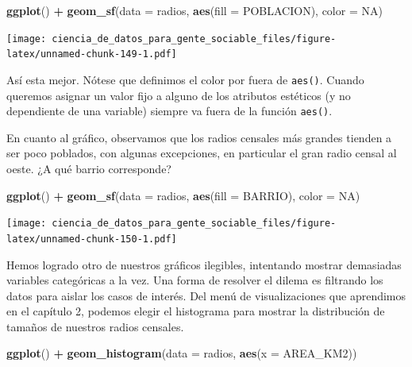 \documentclass[]{book}
\newenvironment{Shaded}{\begin{snugshade}}{\end{snugshade}}
\newcommand{\KeywordTok}[1]{\textcolor[rgb]{0.13,0.29,0.53}{\textbf{#1}}}
\newcommand{\DataTypeTok}[1]{\textcolor[rgb]{0.13,0.29,0.53}{#1}}
\newcommand{\StringTok}[1]{\textcolor[rgb]{0.31,0.60,0.02}{#1}}
\newcommand{\OtherTok}[1]{\textcolor[rgb]{0.56,0.35,0.01}{#1}}
\newcommand{\OperatorTok}[1]{\textcolor[rgb]{0.81,0.36,0.00}{\textbf{#1}}}
\newcommand{\NormalTok}[1]{#1}
\begin{document}
\begin{Shaded}
\begin{Highlighting}[]
\KeywordTok{ggplot}\NormalTok{() }\OperatorTok{+}\StringTok{ }\KeywordTok{geom_sf}\NormalTok{(}\DataTypeTok{data =}\NormalTok{ radios, }\KeywordTok{aes}\NormalTok{(}\DataTypeTok{fill =}\NormalTok{ POBLACION), }\DataTypeTok{color =} \OtherTok{NA}\NormalTok{)}
\end{Highlighting}
\end{Shaded}

\texttt{[image: ciencia\_de\_datos\_para\_gente\_sociable\_files/figure-latex/unnamed-chunk-149-1.pdf]}

Así esta mejor. Nótese que definimos el color por fuera de
\texttt{aes()}. Cuando queremos asignar un valor fijo a alguno de los
atributos estéticos (y no dependiente de una variable) siempre va fuera
de la función \texttt{aes()}.

En cuanto al gráfico, observamos que los radios censales más grandes
tienden a ser poco poblados, con algunas excepciones, en particular el
gran radio censal al oeste. ¿A qué barrio corresponde?

\begin{Shaded}
\begin{Highlighting}[]
\KeywordTok{ggplot}\NormalTok{() }\OperatorTok{+}\StringTok{ }\KeywordTok{geom_sf}\NormalTok{(}\DataTypeTok{data =}\NormalTok{ radios, }\KeywordTok{aes}\NormalTok{(}\DataTypeTok{fill =}\NormalTok{ BARRIO), }\DataTypeTok{color =} \OtherTok{NA}\NormalTok{)}
\end{Highlighting}
\end{Shaded}

\texttt{[image: ciencia\_de\_datos\_para\_gente\_sociable\_files/figure-latex/unnamed-chunk-150-1.pdf]}

Hemos logrado otro de nuestros gráficos ilegibles, intentando mostrar
demasiadas variables categóricas a la vez. Una forma de resolver el
dilema es filtrando los datos para aislar los casos de interés. Del menú
de visualizaciones que aprendimos en el capítulo 2, podemos elegir el
histograma para mostrar la distribución de tamaños de nuestros radios
censales.

\begin{Shaded}
\begin{Highlighting}[]
\KeywordTok{ggplot}\NormalTok{() }\OperatorTok{+}\StringTok{ }\KeywordTok{geom_histogram}\NormalTok{(}\DataTypeTok{data =}\NormalTok{ radios, }\KeywordTok{aes}\NormalTok{(}\DataTypeTok{x =}\NormalTok{ AREA_KM2))}
\end{Highlighting}
\end{Shaded}
\end{document}
